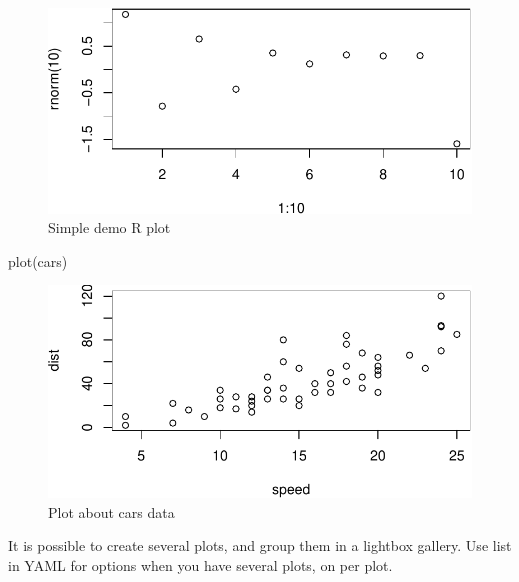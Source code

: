 \documentclass[
  a4paper,
  DIV=11,
  numbers=noendperiod,
  oneside,
  open=any]{scrreprt}
\newenvironment{Shaded}{\begin{snugshade}}{\end{snugshade}}
\newcommand{\FunctionTok}[1]{\textcolor[rgb]{0.28,0.35,0.67}{#1}}
\newcommand{\NormalTok}[1]{\textcolor[rgb]{0.00,0.23,0.31}{#1}}
\begin{document}
\begin{figure}[H]

{\centering \includegraphics{lightbox_files/figure-pdf/unnamed-chunk-1-1.pdf}

}

\caption{Simple demo R plot}

\end{figure}%

\begin{Shaded}
\begin{Highlighting}[]
\FunctionTok{plot}\NormalTok{(cars)}
\end{Highlighting}
\end{Shaded}

\begin{figure}[H]

{\centering \includegraphics{lightbox_files/figure-pdf/unnamed-chunk-2-1.pdf}

}

\caption{Plot about cars data}

\end{figure}%

It is possible to create several plots, and group them in a lightbox
gallery. Use list in YAML for options when you have several plots, on
per plot.
\end{document}
